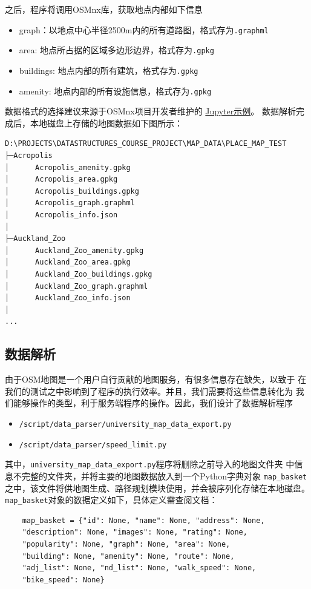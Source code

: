 \documentclass{report}
\begin{document}
之后，程序将调用OSMnx库，获取地点内部如下信息
\begin{itemize}
    \item graph：以地点中心半径2500m内的所有道路图，格式存为\verb|.graphml|
    \item area: 地点所占据的区域多边形边界，格式存为\verb|.gpkg|
    \item buildings: 地点内部的所有建筑，格式存为\verb|.gpkg|
    \item amenity: 地点内部的所有设施信息，格式存为\verb|.gpkg|
\end{itemize}
数据格式的选择建议来源于OSMnx项目开发者维护的
\href{https://github.com/gboeing/osmnx-examples/blob/main/notebooks/05-save-load-networks.ipynb}{Jupyter示例}。
数据解析完成后，本地磁盘上存储的地图数据如下图所示：
\begin{verbatim}
D:\PROJECTS\DATASTRUCTURES_COURSE_PROJECT\MAP_DATA\PLACE_MAP_TEST
├─Acropolis
│      Acropolis_amenity.gpkg
│      Acropolis_area.gpkg
│      Acropolis_buildings.gpkg
│      Acropolis_graph.graphml
│      Acropolis_info.json
│
├─Auckland_Zoo
│      Auckland_Zoo_amenity.gpkg
│      Auckland_Zoo_area.gpkg
│      Auckland_Zoo_buildings.gpkg
│      Auckland_Zoo_graph.graphml
│      Auckland_Zoo_info.json
│
...
\end{verbatim}

\subsection{数据解析}
由于OSM地图是一个用户自行贡献的地图服务，有很多信息存在缺失，以致于
在我们的测试之中影响到了程序的执行效率。并且，我们需要将这些信息转化为
我们能够操作的类型，利于服务端程序的操作。因此，我们设计了数据解析程序
\begin{itemize}
    \item \verb|/script/data_parser/university_map_data_export.py|
    \item \verb|/script/data_parser/speed_limit.py|
\end{itemize}
其中，\verb|university_map_data_export.py|程序将删除之前导入的地图文件夹
中信息不完整的文件夹，并将主要的地图数据放入到一个Python字典对象
\verb|map_basket|之中，该文件将供地图生成、路径规划模块使用，并会被序列化存储在本地磁盘。
\verb|map_basket|对象的数据定义如下，具体定义需查阅文档：
\begin{verbatim}
    map_basket = {"id": None, "name": None, "address": None, 
    "description": None, "images": None, "rating": None, 
    "popularity": None, "graph": None, "area": None, 
    "building": None, "amenity": None, "route": None, 
    "adj_list": None, "nd_list": None, "walk_speed": None, 
    "bike_speed": None}
\end{verbatim}
\end{document}
